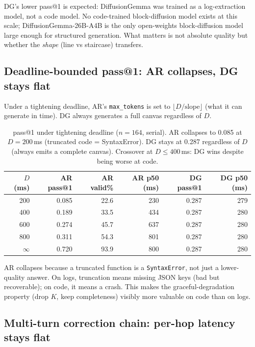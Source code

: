 DG's lower pass@1 is expected: DiffusionGemma was trained as a
log-extraction model, not a code model. No code-trained block-diffusion
model exists at this scale; DiffusionGemma-26B-A4B is the only
open-weights block-diffusion model large enough for structured generation.
What matters is not absolute quality but whether the \emph{shape}
(line vs staircase) transfers.

\subsection{Deadline-bounded pass@1: AR collapses, DG stays flat}

Under a tightening deadline, AR's \texttt{max\_tokens} is set to
$\lfloor D / \text{slope} \rfloor$ (what it can generate in time).
DG always generates a full canvas regardless of $D$.

\begin{table}[h]
\centering
\caption{pass@1 under tightening deadline ($n{=}164$, serial). AR
collapses to 0.085 at $D{=}200$\,ms (truncated code = SyntaxError).
DG stays at 0.287 regardless of $D$ (always emits a complete canvas).
Crossover at $D \leq 400$\,ms: DG wins despite being worse at code.}
\label{tab:deadline}
\begin{tabular}{@{}rrrrrr@{}}
\toprule
$D$ (ms) & AR pass@1 & AR valid\% & AR p50 (ms) & DG pass@1 & DG p50 (ms) \\
\midrule
200  & 0.085 & 22.6 & 230 & 0.287 & 279 \\
400  & 0.189 & 33.5 & 434 & 0.287 & 280 \\
600  & 0.274 & 45.7 & 637 & 0.287 & 280 \\
800  & 0.311 & 54.3 & 801 & 0.287 & 280 \\
$\infty$ & 0.720 & 93.9 & 800 & 0.287 & 280 \\
\bottomrule
\end{tabular}
\end{table}

AR collapses because a truncated function is a \texttt{SyntaxError},
not just a lower-quality answer. On logs, truncation means missing
JSON keys (bad but recoverable); on code, it means a crash. This makes
the graceful-degradation property (drop $K$, keep completeness)
visibly more valuable on code than on logs.

\subsection{Multi-turn correction chain: per-hop latency stays flat}

